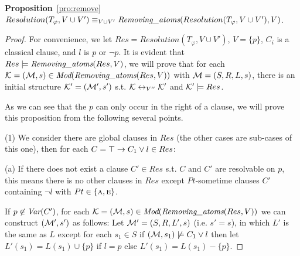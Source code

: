 \documentclass[twoside,11pt]{article}
\begin{document}
	\noindent\textbf{Proposition}~\ref{pro:remove}
	$Resolution(T_{\varphi}, V \cup V') \equiv_{V \cup V'}  \emph{Removing\_atoms}(Resolution(T_{\varphi}, V \cup V'), V)$.
	\\
	\begin{proof}
		For convenience, we let $Res=Resolution(T_{\varphi}, V \cup V')$, $V=\{p\}$,
		$C_i$ is a classical clause,  and $l$ is $p$ or $\neg p$.
		It is evident that $Res \models \emph{Removing\_atoms}(Res, V)$, we will prove that for each ${\cal K}=({\cal M}, s)\in \textit{Mod}(\emph{Removing\_atoms}(Res, V))$ with ${\cal M}=(S, R, L, s)$, there is an initial structure ${\cal K}'=({\cal M}', s')$ s.t. ${\cal K} \leftrightarrow_{V''} {\cal K}'$ and ${\cal K}' \models Res$.
		
		As we can see that the $p$ can only occur in the right of a clause, we will prove this proposition from the following several points.
		
		(1) We consider there are global clauses in $Res$ (the other cases are sub-cases of this one), then for each $C=\top\rightarrow C_1 \vee l \in Res$:
		
		(a) If there does not exist a clause $C'\in Res$ s.t. $C$ and $C'$ are resolvable on $p$, this means there is no other clauses in $Res$ except $Pt$-sometime clauses $C'$ containing $\neg l$ with $Pt\in \{\textsc{a}, \textsc{e}\}$.
		
		If $p\not \in \textit{Var}(C')$, for each ${\cal K}=({\cal M}, s)\in \textit{Mod}(\emph{Removing\_atoms}(Res, V))$ we can construct $({\cal M}',s')$ as follows: Let ${\cal M}'= (S, R, L',s)$ (i.e. $s'=s$), in which $L'$ is the same as $L$ except for each $s_1\in S$ if $({\cal M}, s_1) \not \models C_1 \vee l$ then let $L'(s_1) = L(s_1) \cup \{p\}$ if $l=p$ else $L'(s_1) = L(s_1) - \{p\}$.
		

\end{proof}
\end{document}
